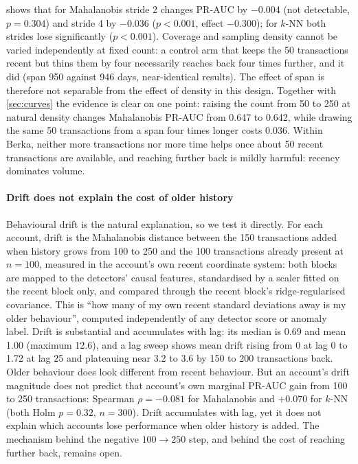  shows that for Mahalanobis stride 2 changes PR-AUC by $-0.004$ (not detectable, $p=0.304$) and stride 4 by $-0.036$ ($p<0.001$, effect $-0.300$); for $k$-NN both strides lose significantly ($p<0.001$). Coverage and sampling density cannot be varied independently at fixed count: a control arm that keeps the 50 transactions recent but thins them by four necessarily reaches back four times further, and it did (span 950 against 946 days, near-identical results). The effect of span is therefore not separable from the effect of density in this design. Together with \cref{sec:curves} the evidence is clear on one point: raising the count from 50 to 250 at natural density changes Mahalanobis PR-AUC from 0.647 to 0.642, while drawing the same 50 transactions from a span four times longer costs 0.036. Within Berka, neither more transactions nor more time helps once about 50 recent transactions are available, and reaching further back is mildly harmful: recency dominates volume.

\paragraph{Drift does not explain the cost of older history}
Behavioural drift is the natural explanation, so we test it directly. For each account, drift is the Mahalanobis distance between the 150 transactions added when history grows from 100 to 250 and the 100 transactions already present at $n=100$, measured in the account's own recent coordinate system: both blocks are mapped to the detectors' causal features, standardised by a scaler fitted on the recent block only, and compared through the recent block's ridge-regularised covariance. This is ``how many of my own recent standard deviations away is my older behaviour'', computed independently of any detector score or anomaly label. Drift is substantial and accumulates with lag: its median is 0.69 and mean 1.00 (maximum 12.6), and a lag sweep shows mean drift rising from 0 at lag 0 to 1.72 at lag 25 and plateauing near 3.2 to 3.6 by 150 to 200 transactions back. Older behaviour does look different from recent behaviour. But an account's drift magnitude does not predict that account's own marginal PR-AUC gain from 100 to 250 transactions: Spearman $\rho=-0.081$ for Mahalanobis and $+0.070$ for $k$-NN (both Holm $p=0.32$, $n=300$). Drift accumulates with lag, yet it does not explain which accounts lose performance when older history is added. The mechanism behind the negative $100\to250$ step, and behind the cost of reaching further back, remains open.

